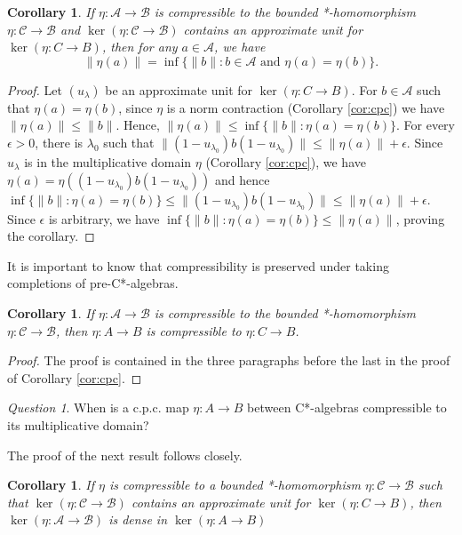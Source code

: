 \documentclass[a4paper, 12pt]{amsart}
\newtheorem{cor}[thm]{Corollary}
\theoremstyle{definition}
\theoremstyle{remark}
\newtheorem{qtn}[thm]{Question}
\numberwithin{equation}{section}
\begin{document}
\begin{cor}
\label{cor:quotientnorm}
    If $\eta:\mathcal{A}\to\mathcal{B}$ is compressible to the bounded *-homomorphism $\eta:\mathcal{C}\to\mathcal{B}$ and $\ker(\eta:\mathcal{C}\to\mathcal{B})$ contains an approximate unit for $\ker(\eta:C\to B)$, then for any $a\in\mathcal{A}$, we have
\begin{equation}
\label{eq:norm2}
    \|\eta(a)\| = \inf\{\|b\|:b\in\mathcal{A}\text{ and }\eta(a) = \eta(b)\}.
\end{equation}
\end{cor}
\begin{proof}
    Let $(u_{\lambda})$ be an approximate unit for $\ker(\eta:C\to B)$. For $b\in \mathcal{A}$ such that $\eta(a) = \eta(b)$, since $\eta$ is a norm contraction (Corollary \ref{cor:cpc}) we have $\|\eta(a)\|\leq \|b\|$. Hence, $\|\eta(a)\|\leq \inf\{\|b\|:\eta(a) = \eta(b)\}$. For every $\epsilon > 0$, there is $\lambda_{0}$ such that $\|(1-u_{\lambda_{0}})b(1-u_{\lambda_{0}})\|\leq \|\eta(a)\| + \epsilon $. Since $u_{\lambda}$ is in the multiplicative domain $\eta$ (Corollary \ref{cor:cpc}), we have $\eta(a) = \eta((1-u_{\lambda_{0}})b(1-u_{\lambda_{0}}))$ and hence $\inf\{\|b\|:\eta(a) = \eta(b)\}\leq \|(1-u_{\lambda_{0}})b(1-u_{\lambda_{0}})\|\leq \|\eta(a)\| + \epsilon$. Since $\epsilon $ is arbitrary, we have $\inf\{\|b\|:\eta(a) = \eta(b)\}\leq \|\eta(a)\|$, proving the corollary.
\end{proof}

It is important to know that compressibility is preserved under taking completions of pre-C*-algebras.

\begin{cor}
\label{cor:completion}
    If $\eta:\mathcal{A}\to\mathcal{B}$ is compressible to the bounded *-homomorphism $\eta:\mathcal{C}\to \mathcal{B}$, then $\eta:A\to B$ is compressible to $\eta:C\to B$.
\end{cor}
\begin{proof}
    The proof is contained in the three paragraphs before the last in the proof of Corollary \ref{cor:cpc}.
\end{proof}

\begin{qtn}
    When is a c.p.c. map $\eta:A\to B$ between C*-algebras compressible to its multiplicative domain?
\end{qtn}

The proof of the next result follows \cite[Corollary~2.7]{CN22} closely. 


\begin{cor}
\label{cor:prekerdense}
    If $\eta$ is compressible to a bounded *-homomorphism $\eta:\mathcal{C}\to\mathcal{B}$ such that $\ker(\eta:\mathcal{C}\to\mathcal{B})$ contains an approximate unit for $\ker(\eta:C\to B)$, then $\ker(\eta:\mathcal{A}\to\mathcal{B})$ is dense in $\ker(\eta:A\to B)$
\end{cor}
\end{document}
